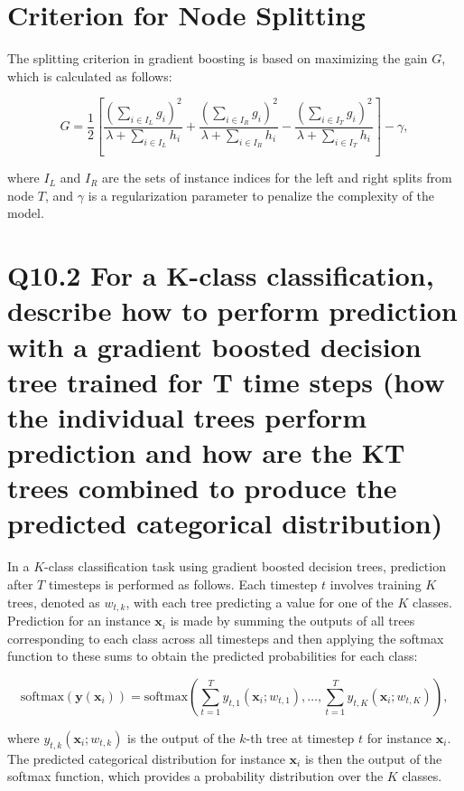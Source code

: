 \documentclass[11pt]{article}
\begin{document}
\section{Criterion for Node Splitting}

The splitting criterion in gradient boosting is based on maximizing the gain $G$, which is calculated as follows:

\begin{equation}
G = \frac{1}{2} \left[ \frac{(\sum_{i \in I_L} g_i)^2}{\lambda + \sum_{i \in I_L} h_i} + \frac{(\sum_{i \in I_R} g_i)^2}{\lambda + \sum_{i \in I_R} h_i} - \frac{(\sum_{i \in I_T} g_i)^2}{\lambda + \sum_{i \in I_T} h_i} \right] - \gamma,
\end{equation}

where $I_L$ and $I_R$ are the sets of instance indices for the left and right splits from node $T$, and $\gamma$ is a regularization parameter to penalize the complexity of the model.

\section{Q10.2 For a K-class classification, describe how to perform prediction with a gradient boosted decision tree trained for T time steps (how the individual trees perform prediction and how are the KT trees combined to produce the predicted categorical distribution)}

In a \( K \)-class classification task using gradient boosted decision trees, prediction after \( T \) timesteps is performed as follows. Each timestep \( t \) involves training \( K \) trees, denoted as \( w_{t,k} \), with each tree predicting a value for one of the \( K \) classes. Prediction for an instance \( \mathbf{x}_i \) is made by summing the outputs of all trees corresponding to each class across all timesteps and then applying the softmax function to these sums to obtain the predicted probabilities for each class:

\begin{equation}
\text{softmax}(\mathbf{y}(\mathbf{x}_i)) = \text{softmax} \left( \sum_{t=1}^{T} y_{t,1}(\mathbf{x}_i; w_{t,1}), \ldots, \sum_{t=1}^{T} y_{t,K}(\mathbf{x}_i; w_{t,K}) \right),
\end{equation}

where \( y_{t,k}(\mathbf{x}_i; w_{t,k}) \) is the output of the \( k \)-th tree at timestep \( t \) for instance \( \mathbf{x}_i \). The predicted categorical distribution for instance \( \mathbf{x}_i \) is then the output of the softmax function, which provides a probability distribution over the \( K \) classes.
\end{document}
